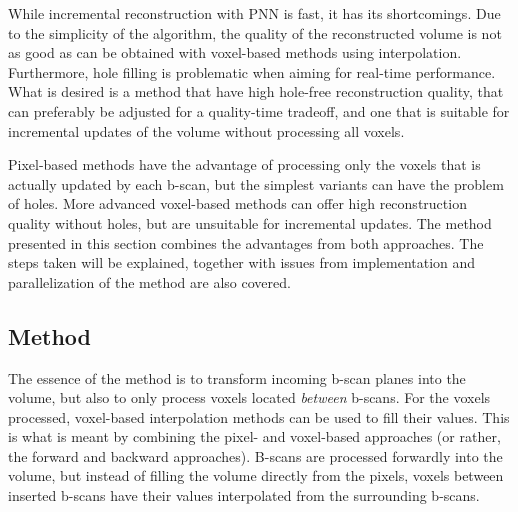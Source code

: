 While incremental reconstruction with PNN is fast, it has its shortcomings. Due to the simplicity of the algorithm, the quality of the reconstructed volume is not as good as can be obtained with voxel-based methods using interpolation. Furthermore, hole filling is problematic when aiming for real-time performance. What is desired is a method that have high hole-free reconstruction quality, that can preferably be adjusted for a quality-time tradeoff, and one that is suitable for incremental updates of the volume without processing all voxels.

Pixel-based methods have the advantage of processing only the voxels that is actually updated by each b-scan, but the simplest variants can have the problem of holes. More advanced voxel-based methods can offer high reconstruction quality without holes, but are unsuitable for incremental updates. The method presented in this section combines the advantages from both approaches. The steps taken will be explained, together with issues from implementation and parallelization of the method are also covered.

\subsection{Method}


The essence of the method is to transform incoming b-scan planes into the volume, but also to only process voxels located \emph{between} b-scans. For the voxels processed, voxel-based interpolation methods can be used to fill their values. This is what is meant by combining the pixel- and voxel-based approaches (or rather, the forward and backward approaches). B-scans are processed forwardly into the volume, but instead of filling the volume directly from the pixels, voxels between inserted b-scans have their values interpolated from the surrounding b-scans.


